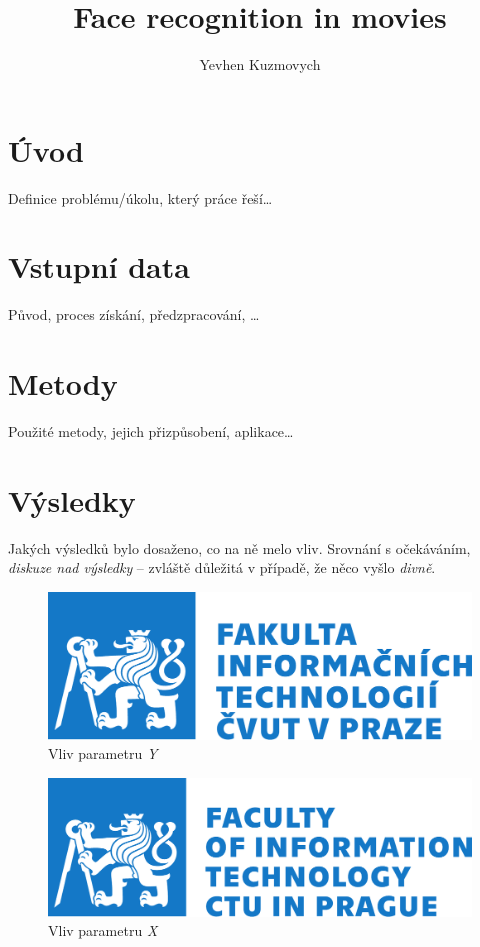 \documentclass[english]{mvi-report}
\title{Face recognition in movies}
\author{Yevhen Kuzmovych}
\affiliation{ČVUT - FIT}
\begin{document}
\maketitle

\section{Úvod}
Definice problému/úkolu, který práce řeší\ldots


\section{Vstupní data}
Původ, proces získání, předzpracování, \ldots

\section{Metody}
Použité metody, jejich přizpůsobení, aplikace\ldots

\section{Výsledky}

Jakých výsledků bylo dosaženo, co na ně melo vliv. Srovnání s očekáváním, \emph{diskuze nad výsledky} -- zvláště důležitá v případě, že něco vyšlo \emph{divně}.

\begin{figure}[h]
  \centering\leavevmode
  \includegraphics[width=.45\linewidth]{img/fit-logo-cz.pdf}\vskip-0.5cm
  \caption{Vliv parametru \emph{Y}}
  \label{fig:par-y}
\end{figure}
\begin{figure}[h]
  \centering\leavevmode
  \includegraphics[width=.45\linewidth]{img/fit-logo-en.pdf}\vskip-0.5cm
  \caption{Vliv parametru \emph{X}}
  \label{fig:par-x}
\end{figure}
\end{document}

